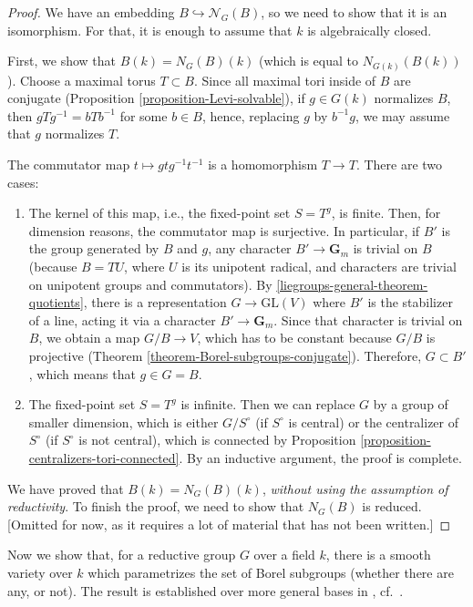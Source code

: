 \begin{proof}
 We have an embedding $B\hookrightarrow \mathcal N_G(B)$, so we need to show that it is an isomorphism. For that, it is enough to assume that $k$ is algebraically closed. 
 
 First, we show that $B(k) = N_G(B)(k)$ (which is equal to $N_{G(k)}(B(k))$). 
 Choose a maximal torus $T\subset B$. Since all maximal tori inside of $B$ are conjugate (Proposition \ref{proposition-Levi-solvable}), if $g\in G(k)$ normalizes $B$, then $gTg^{-1}=bTb^{-1}$ for some $b\in B$, hence, replacing $g$ by $b^{-1}g$, we may assume that $g$ normalizes $T$.
  
The commutator map $t\mapsto g t g^{-1} t^{-1}$ is a homomorphism $T\to T$. There are two cases:
\begin{enumerate}
 \item The kernel of this map, i.e., the fixed-point set $S=T^g$, is finite. Then, for dimension reasons, the commutator map is surjective. In particular, if $B'$ is the group generated by $B$ and $g$, any character $B'\to \mathbf G_m$ is trivial on $B$ (because $B=TU$, where $U$ is its unipotent radical, and characters are trivial on unipotent groups and commutators). By \ref{liegroups-general-theorem-quotients}, there is a representation $G\to \text{GL}(V)$ where $B'$ is the stabilizer of a line, acting it via a character $B'\to \mathbf G_m$. Since that character is trivial on $B$, we obtain a map $G/B\to V$, which has to be constant because $G/B$ is projective (Theorem \ref{theorem-Borel-subgroups-conjugate}). Therefore, $G\subset B'$, which means that $g\in G = B$. 
 
 \item The fixed-point set $S=T^g$ is infinite. Then we can replace $G$ by a group of smaller dimension, which is either $G/S^\circ$ (if $S^\circ$ is central) or the centralizer of $S^\circ$ (if $S^\circ$ is not central), which is connected by Proposition \ref{proposition-centralizers-tori-connected}. By an inductive argument, the proof is complete.
\end{enumerate}

 We have proved that $B(k) = N_G(B)(k)$, \emph{without using the assumption of reductivity}. To finish the proof, we need to show that $N_G(B)$ is reduced. [Omitted for now, as it requires a lot of material that has not been written.]
\end{proof}




Now we show that, for a reductive group $G$ over a field $k$, there is a smooth variety over $k$ which parametrizes the set of Borel subgroups (whether there are any, or not). The result is established over more general bases in \cite[XXII, Corollaire 5.8.3]{SGA3}, cf.\ \cite[Corollary 5.2.9]{Conrad-RGS}. 

